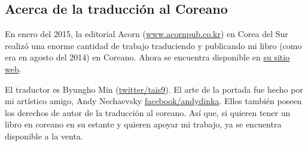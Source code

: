 



\subsection*{Acerca de la traducci\'on al Coreano}

En enero del 2015, la editorial Acorn (\href{http://www.acornpub.co.kr}{www.acornpub.co.kr}) en Corea del Sur realiz\'o una enorme cantidad de trabajo
traduciendo y publicando mi libro (como era en agosto del 2014) en Coreano.
Ahora se encuentra disponible en
\href{http://go.yurichev.com/17343}{su sitio web}.

\iffalse
\begin{figure}[H]
\centering
\texttt{[image: acorn\_cover.jpg]}
\end{figure}
\fi

El traductor es Byungho Min (\href{http://go.yurichev.com/17344}{twitter/tais9}).
El arte de la portada fue hecho por mi art\'istico amigo, Andy Nechaevsky
\href{http://go.yurichev.com/17023}{facebook/andydinka}.
Ellos tambi\'en poseen los derechos de autor de la traducci\'on al coreano.
As\'i que, si quieren tener un libro  en coreano en su estante
y quieren apoyar mi trabajo, ya se encuentra disponible a la venta.


